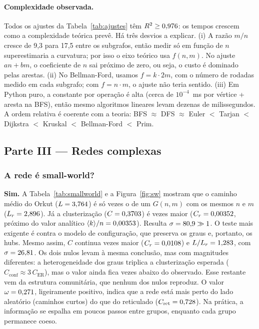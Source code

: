\IfFileExists{webmedia.cls}{\documentclass[sigconf]{webmedia}}{\documentclass[sigconf]{acmart}}
\begin{document}
\paragraph{Complexidade observada.} Todos os ajustes da Tabela~\ref{tab:ajustes} têm $R^2 \geq 0{,}976$: os tempos crescem como a complexidade teórica prevê. Há três desvios a explicar. (i) A razão $m/n$ cresce de 9,3 para 17,5 entre os subgrafos, então medir só em função de $n$ superestimaria a curvatura; por isso o eixo teórico usa $f(n,m)$. No ajuste $an + bm$, o coeficiente de $n$ sai próximo de zero, ou seja, o custo é dominado pelas arestas. (ii) No Bellman-Ford, usamos $f = k \cdot 2m$, com o número de rodadas medido em cada subgrafo; com $f = n \cdot m$, o ajuste não teria sentido. (iii) Em Python puro, a constante por operação é alta (cerca de $10^{-4}$~ms por vértice + aresta na BFS), então mesmo algoritmos lineares levam dezenas de milissegundos. A ordem relativa é coerente com a teoria: BFS $\approx$ DFS $\approx$ Euler $<$ Tarjan $<$ Dijkstra $<$ Kruskal $<$ Bellman-Ford $<$ Prim. %

\subsection{Parte III --- Redes complexas}
\subsubsection{A rede é small-world?}
\textbf{Sim.} A Tabela~\ref{tab:smallworld} e a Figura~\ref{fig:sw} mostram que o caminho médio do Orkut ($L = 3{,}764$) é só \swLambdaER{} vezes o de um $G(n,m)$ com os mesmos $n$ e $m$ ($L_r = 2{,}896$). Já a clusterização ($C = 0{,}3703$) é \swGammaER{} vezes maior ($C_r = 0{,}00352$, próximo do valor analítico $\langle k \rangle/n = 0{,}00353$). Resulta $\sigma = 80{,}9 \gg 1$. O teste mais exigente é contra o modelo de configuração, que preserva os graus e, portanto, os hubs. Mesmo assim, $C$ continua \swGammaConf{} vezes maior ($C_r = 0{,}0108$) e $L/L_r = 1{,}283$, com $\sigma = 26{,}81$. Os dois nulos levam à mesma conclusão, mas com magnitudes diferentes: a heterogeneidade dos graus triplica a clusterização esperada ($C_{\text{conf}} \approx 3\,C_{\text{ER}}$), mas o valor ainda fica \swGammaConf{} vezes abaixo do observado. Esse restante vem da estrutura comunitária, que nenhum dos nulos reproduz. O valor $\omega = 0{,}271$, ligeiramente positivo, indica que a rede está mais perto do lado aleatório (caminhos curtos) do que do reticulado ($C_{\text{ret}} = 0{,}728$). Na prática, a informação se espalha em poucos passos entre grupos, enquanto cada grupo permanece coeso. %
\end{document}
